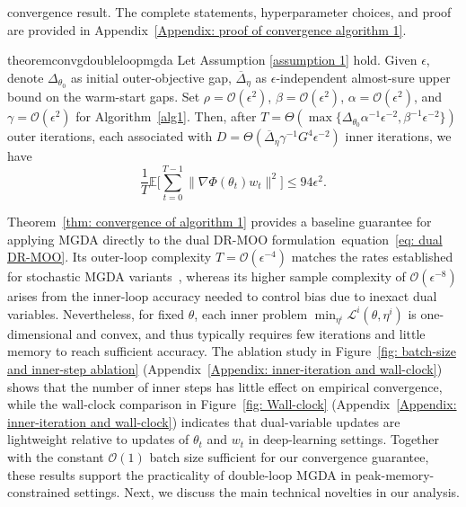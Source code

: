 \documentclass[twoside]{article} %
\def\eqref#1{equation~\ref{#1}}
\theoremstyle{plain}
\theoremstyle{definition}
\theoremstyle{remark}
\newcommand{\fL}{\mathcal{L}}
\begin{document}
convergence result. The complete
statements, hyperparameter choices, and proof are provided in
Appendix~\ref{Appendix: proof of convergence algorithm 1}.
\begin{restatable}{theorem}{convgdoubleloopmgda}\label{thm: convergence of algorithm 1}
    Let Assumption \ref{assumption 1} hold. Given $\epsilon$, denote $\Delta_{\theta_0}$ as initial outer-objective gap, $\overline\Delta_\eta$ as $\epsilon$-independent almost-sure upper bound on the warm-start gaps.
    Set $\rho=\mathcal{O}( \epsilon^2)$, $\beta =\mathcal{O}(\epsilon^2)$,
    $\alpha = \mathcal{O}(\epsilon^2)$, and $\gamma = \mathcal{O}(\epsilon^2)$ for Algorithm~\ref{alg1}. Then, after $T=\Theta(\max\{\Delta_{\theta_0}\alpha^{-1}\epsilon^{-2},\beta^{-1}\epsilon^{-2}\})$ outer iterations, each associated with $D=\Theta(\overline{\Delta}_{\eta}\gamma^{-1}G^4\epsilon^{-2})$ inner iterations, we have \[\frac{1}{T}\mathbb{E}\big[\sum_{t=0}^{T-1}\|\nabla \Phi(\theta_t)w_t\|^2\big]\leq 94\epsilon^2.\]
\end{restatable}

Theorem~\ref{thm: convergence of algorithm 1} provides a baseline guarantee for applying MGDA directly to the dual DR-MOO formulation~\eqref{eq: dual DR-MOO}. Its outer-loop complexity \(T=\mathcal{O}(\epsilon^{-4})\) matches the rates established for stochastic MGDA variants~\citep{SDMkaiyiJi,MOCO,MODO,qimgda}, whereas its higher sample complexity of \(\mathcal{O}(\epsilon^{-8})\) arises from the inner-loop accuracy needed to control bias due to inexact dual variables. Nevertheless, for fixed \(\theta\), each inner problem \(\min_{\eta^i}\fL^i(\theta,\eta^i)\) is one-dimensional and convex, and thus typically requires few iterations and little memory to reach sufficient accuracy. The ablation study in Figure~\ref{fig: batch-size and inner-step ablation} (Appendix~\ref{Appendix: inner-iteration and wall-clock}) shows that the number of inner steps has little effect on empirical convergence, while the wall-clock comparison in Figure~\ref{fig: Wall-clock} (Appendix~\ref{Appendix: inner-iteration and wall-clock}) indicates that dual-variable updates are lightweight relative to updates of \(\theta_t\) and \(w_t\) in deep-learning settings. Together with the constant \(\mathcal{O}(1)\) batch size sufficient for our convergence guarantee, these results support the practicality of double-loop MGDA in peak-memory-constrained settings. Next, we discuss the main technical novelties in our analysis.
\end{document}
